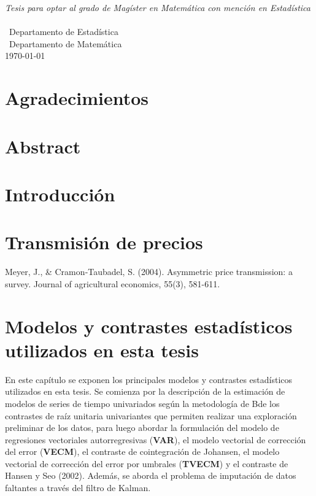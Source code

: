 \documentclass[12pt, twoside]{book}\usepackage[]{graphicx}\usepackage[]{color}
\numberwithin{equation}{section}
\numberwithin{theorem}{section}
\numberwithin{teorema}{section}
\numberwithin{defi}{section}
\numberwithin{prop}{section}
\numberwithin{defi}{section}
\theoremstyle{plain}
\begin{document}
\begin{titlepage}
\begin{center}
\large \textit{Tesis para optar al grado de Magíster en Matemática con mención en Estadística}\\[0.3cm] %
\textit{}\\[0.4cm]
\ Departamento de Estadística \\
[0.4cm]\ Departamento de Matemática
\\[1cm] %
 
{\large \today}\\[2cm] %
 
\end{center}

\end{titlepage}
\newpage



\tableofcontents

\listoffigures
\listoftables
\onehalfspacing
\chapter*{Agradecimientos}
\chapter*{Abstract}
\chapter{Introducción}


\chapter{Transmisión de precios}

Meyer, J., & Cramon‐Taubadel, S. (2004). Asymmetric price transmission: a survey. Journal of agricultural economics, 55(3), 581-611.


\chapter{Modelos y contrastes estadísticos utilizados en esta tesis}

En este capítulo se exponen los principales modelos y contrastes estadísticos utilizados en esta tesis. Se comienza por la descripción de la estimación de modelos de series de tiempo univariados según la metodología de Bde los contrastes de raíz unitaria univariantes que permiten realizar una exploración preliminar de los datos, para luego abordar la formulación del modelo de regresiones vectoriales autorregresivas (\textbf{VAR}), el modelo vectorial de corrección del error (\textbf{VECM}), el contraste de cointegración de Johansen, el modelo vectorial de corrección del error por umbrales (\textbf{TVECM}) y el contraste de Hansen y Seo (2002). Además, se aborda el problema de imputación de datos faltantes a través del filtro de Kalman. 
\end{document}

